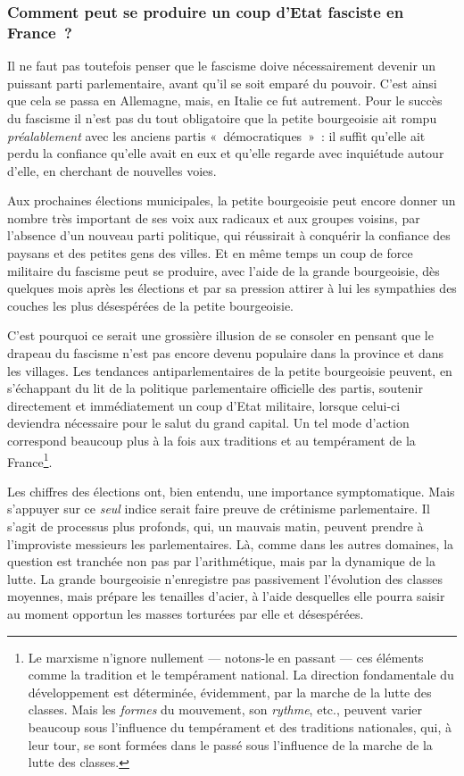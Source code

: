 \documentclass[french,twoside]{book} %
\begin{document}
\subsubsection[{Comment peut se produire un coup d’Etat fasciste en France ?}]{Comment peut se produire un coup d’Etat fasciste en France ?}
\noindent Il ne faut pas toutefois penser que le fascisme doive nécessairement devenir un puissant parti parlementaire, avant qu’il se soit emparé du pouvoir. C’est ainsi que cela se passa en Allemagne, mais, en Italie ce fut autrement. Pour le succès du fascisme il n’est pas du tout obligatoire que la petite bourgeoisie ait rompu \emph{préalablement} avec les  anciens partis « démocratiques » : il suffit qu’elle ait perdu la confiance qu’elle avait en eux et qu’elle regarde avec inquiétude autour d’elle, en cherchant de nouvelles voies.\par
Aux prochaines élections municipales, la petite bourgeoisie peut encore donner un nombre très important de ses voix aux radicaux et aux groupes voisins, par l’absence d’un nouveau parti politique, qui réussirait à conquérir la confiance des paysans et des petites gens des villes. Et en même temps un coup de force militaire du fascisme peut se produire, avec l’aide de la grande bourgeoisie, dès quelques mois après les élections et par sa pression attirer à lui les sympathies des couches les plus désespérées de la petite bourgeoisie.\par
C’est pourquoi ce serait une grossière illusion de se consoler en pensant que le drapeau du fascisme n’est pas encore devenu populaire dans la province et dans les villages. Les tendances antiparlementaires de la petite bourgeoisie peuvent, en s’échappant du lit de la politique parlementaire officielle des partis, soutenir directement et immédiatement un coup d’Etat militaire, lorsque celui-ci deviendra nécessaire pour le salut du grand capital. Un tel mode d’action correspond beaucoup plus à la fois aux traditions et au tempérament de la France\footnote{ \noindent Le marxisme n’ignore nullement — notons-le en passant — ces éléments comme la tradition et le tempérament national. La direction fondamentale du développement est déterminée, évidemment, par la marche de la lutte des classes. Mais les \emph{formes} du mouvement, son \emph{rythme}, etc., peuvent varier beaucoup sous l’influence du tempérament et des traditions nationales, qui, à leur tour, se sont formées dans le passé sous l’influence de la marche de la lutte des classes.
 }.\par
Les chiffres des élections ont, bien entendu, une importance symptomatique. Mais s’appuyer sur ce \emph{seul} indice serait faire preuve de crétinisme parlementaire. Il s’agit de processus plus profonds, qui, un mauvais matin, peuvent prendre à l’improviste messieurs les parlementaires. Là,  comme dans les autres domaines, la question est tranchée non pas par l’arithmétique, mais par la dynamique de la lutte. La grande bourgeoisie n’enregistre pas passivement l’évolution des classes moyennes, mais prépare les tenailles d’acier, à l’aide desquelles elle pourra saisir au moment opportun les masses torturées par elle et désespérées.
\end{document}
